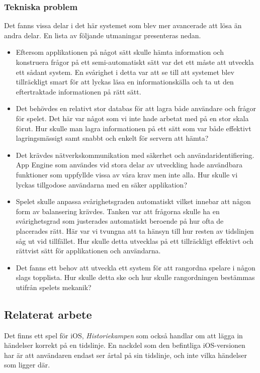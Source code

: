 \documentclass[a4paper, 11pt]{article}
\begin{document}
\subsubsection{Tekniska problem}
Det fanns vissa delar i det här systemet som blev mer avancerade att lösa än andra delar. En lista av följande utmaningar presenteras nedan.
\begin{itemize}
\item Eftersom applikationen på något sätt skulle hämta information och konstruera frågor på ett semi-automatiskt sätt var det ett måste att utveckla ett sådant system. En svårighet i detta var att se till att systemet blev tillräckligt smart för att lyckas läsa en informationskälla och ta ut den eftertraktade informationen på rätt sätt.
\item Det behövdes en relativt stor databas för att lagra både användare och frågor för spelet. Det här var något som vi inte hade arbetat med på en stor skala förut. Hur skulle man lagra informationen på ett sätt som var både effektivt lagringsmässigt samt snabbt och enkelt för servern att hämta?
\item Det krävdes nätverkskommunikation med säkerhet och användaridentifiering. App Engine som användes vid stora delar av utveckling hade användbara funktioner som uppfyllde vissa av våra krav men inte alla. Hur skulle vi lyckas tillgodose användarna med en säker applikation?
\item Spelet skulle anpassa svårighetsgraden automatiskt vilket innebar att någon form av balansering krävdes. Tanken var att frågorna skulle ha en svårighetsgrad som justerades automatiskt beroende på hur ofta de placerades rätt. Här var vi tvungna att ta hänsyn till hur resten av tidslinjen såg ut vid tillfället. Hur skulle detta utvecklas på ett tillräckligt effektivt och rättvist sätt för applikationen och användarna.
\item Det fanns ett behov att utveckla ett system för att rangordna spelare i någon slags topplista. Hur skulle detta ske och hur skulle rangordningen bestämmas utifrån spelets mekanik? 
\end{itemize}

\subsection{Relaterat arbete}
Det finns ett spel för iOS, \textit{Historiekampen} \cite{historiekampen} som också handlar om att lägga in händelser korrekt på en tidslinje. En nackdel som den befintliga iOS-versionen har är att användaren endast ser årtal på sin tidslinje, och inte vilka händelser som ligger där.
\end{document}
